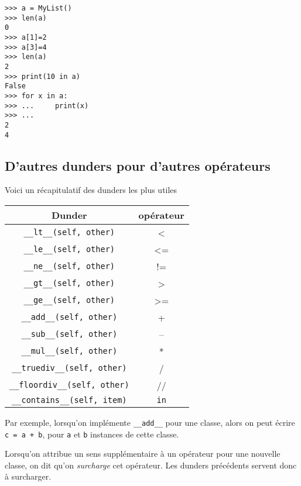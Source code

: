 \documentclass[a4paper,10pt,cours,firamath]{nsi}
\begin{document}
\begin{pyc}
	\begin{verbatim}
>>> a = MyList()
>>> len(a)
0
>>> a[1]=2
>>> a[3]=4
>>> len(a)
2
>>> print(10 in a)
False
>>> for x in a:
>>> ...     print(x)
>>> ...
2
4
\end{verbatim}
\end{pyc}

\subsection{D'autres dunders pour d'autres opérateurs}
Voici un récapitulatif des dunders les plus utiles


\begin{center}
	\tabstyle[UGLiBlue]
	\begin{tabular}{|c|c|}
		
	\ccell Dunder                   & \ccell opérateur \\
		\hline
		\texttt{__lt__(self, other)}       & <                               \\\hline
		\texttt{__le__(self, other)}       & <=                              \\\hline
		\texttt{__ne__(self, other)}       & !=                              \\\hline
		\texttt{__gt__(self, other)}       & >                               \\\hline
		\texttt{__ge__(self, other)}       & >=                              \\\hline
		\texttt{__add__(self, other)}      & +                               \\\hline
		\texttt{__sub__(self, other)}      & –                               \\\hline
		\texttt{__mul__(self, other)}      & *                               \\\hline
		\texttt{__truediv__(self, other)}  & /                               \\\hline
		\texttt{__floordiv__(self, other)} & //                              \\\hline
		\texttt{__contains__(self, item)}  & \texttt{in}         \\\hline
	\end{tabular}
\end{center}
Par exemple, lorsqu'on implémente \texttt{__add__} pour une classe, alors on peut écrire \texttt{c = a + b}, pour \texttt{a} et \texttt{b} instances de cette classe.
\begin{definition}[ : surcharge]
	Lorsqu'on attribue un sens supplémentaire à un opérateur pour une nouvelle classe, on dit qu'on \textit{surcharge} cet opérateur. Les dunders précédents servent donc à surcharger.
\end{definition}
\end{document}
